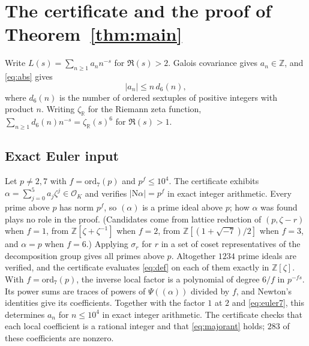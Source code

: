 \documentclass[11pt]{amsart}
\theoremstyle{remark}
\theoremstyle{definition}
\newcommand{\Z}{\mathbb{Z}}
\newcommand{\R}{\mathbb{R}}
\newcommand{\OK}{\mathcal{O}_K}
\newcommand{\Nm}{\mathrm{N}}
\begin{document}
\section{The certificate and the proof of Theorem~\ref{thm:main}}\label{sec:cert}

Write $L(s)=\sum_{n\ge1}a_nn^{-s}$ for $\Re(s)>2$. Galois covariance gives $a_n\in\Z$, and \eqref{eq:abs} gives
\begin{equation}\label{eq:majorant}
|a_n|\le n\,d_6(n),
\end{equation}
where $d_6(n)$ is the number of ordered sextuples of positive integers with product $n$. Writing $\zeta_\R$ for the Riemann zeta function, $\sum_{n\ge1} d_6(n)n^{-s}=\zeta_\R(s)^6$ for $\Re(s)>1$.

\subsection{Exact Euler input}
Let $p\ne2,7$ with $f=\mathrm{ord}_7(p)$ and $p^{f}\le10^4$. The certificate exhibits $\alpha=\sum_{j=0}^5a_j\zeta^j\in\OK$ and verifies $|\Nm\alpha|=p^{f}$ in exact integer arithmetic. Every prime above $p$ has norm $p^f$, so $(\alpha)$ is a prime ideal above $p$; how $\alpha$ was found plays no role in the proof. (Candidates come from lattice reduction of $(p,\zeta-r)$ when $f=1$, from $\Z[\zeta+\zeta^{-1}]$ when $f=2$, from $\Z[(1+\sqrt{-7})/2]$ when $f=3$, and $\alpha=p$ when $f=6$.) Applying $\sigma_r$ for $r$ in a set of coset representatives of the decomposition group gives all primes above $p$. Altogether $1234$ prime ideals are verified, and the certificate evaluates \eqref{eq:def} on each of them exactly in $\Z[\zeta]$. With $f=\mathrm{ord}_7(p)$, the inverse local factor is a polynomial of degree $6/f$ in $p^{-fs}$. Its power sums are traces of powers of $\Psi((\alpha))$ divided by $f$, and Newton's identities give its coefficients. Together with the factor $1$ at $2$ and \eqref{eq:euler7}, this determines $a_n$ for $n\le10^4$ in exact integer arithmetic. The certificate checks that each local coefficient is a rational integer and that \eqref{eq:majorant} holds; $283$ of these coefficients are nonzero.
\end{document}
